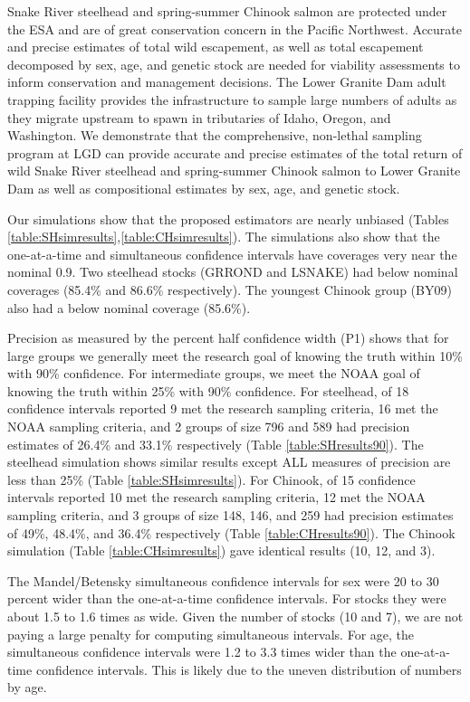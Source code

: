 \documentclass[12pt]{article}
\begin{document}
Snake River steelhead and spring-summer Chinook salmon are protected under the ESA and are of great conservation concern in the Pacific Northwest. Accurate and precise estimates of total wild escapement, as well as total escapement decomposed by sex, age, and genetic stock are needed for viability assessments to inform conservation and management decisions. The Lower Granite Dam adult trapping facility provides the infrastructure to sample large numbers of adults as they migrate upstream to spawn in tributaries of Idaho, Oregon, and Washington. We demonstrate that the comprehensive, non-lethal sampling program at LGD can provide accurate and precise estimates of the total return of wild Snake River steelhead and spring-summer Chinook salmon to Lower Granite Dam as well as compositional estimates by sex, age, and genetic stock.

Our simulations show that the proposed estimators are nearly unbiased (Tables \ref{table:SHsimresults},\ref{table:CHsimresults}).  The simulations also show that the one-at-a-time and simultaneous confidence intervals have coverages very near the nominal 0.9.  Two steelhead stocks (GRROND and LSNAKE) had below nominal coverages (85.4\% and 86.6\% respectively).  The youngest Chinook group (BY09) also had a below nominal coverage (85.6\%).

Precision as measured by the percent half confidence width (P1) shows that for large groups we generally meet the research goal of knowing the truth within 10\% with 90\% confidence.  For intermediate groups, we meet the NOAA goal of knowing the truth within 25\% with 90\% confidence.  For steelhead, of 18 confidence intervals reported 9 met the research sampling criteria, 16 met the NOAA sampling criteria, and 2 groups of size 796 and 589 had precision estimates of 26.4\% and 33.1\% respectively (Table \ref{table:SHresults90}). The steelhead simulation shows similar results except ALL measures of precision are less than 25\% (Table \ref{table:SHsimresults}). For Chinook, of 15 confidence intervals reported 10 met the research sampling criteria, 12 met the NOAA sampling criteria, and 3 groups of size 148, 146, and 259 had precision estimates of 49\%, 48.4\%, and 36.4\% respectively (Table \ref{table:CHresults90}).  The Chinook simulation (Table \ref{table:CHsimresults}) gave identical results (10, 12, and 3).

The Mandel/Betensky simultaneous confidence intervals for sex were 20 to 30 percent wider than the one-at-a-time confidence intervals.  For stocks they were about 1.5 to 1.6 times as wide.  Given the number of stocks (10 and 7), we are not paying a large penalty for computing simultaneous intervals.  For age, the simultaneous confidence intervals were 1.2 to 3.3 times wider than the one-at-a-time confidence intervals. This is likely due to the uneven distribution of numbers by age.
\end{document}
